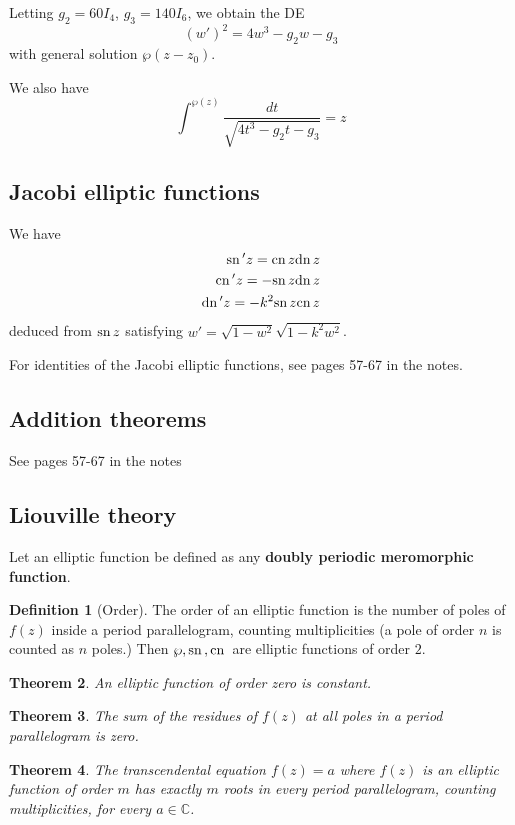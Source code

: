 \documentclass[10pt, oneside, reqno]{amsart}
\theoremstyle{plain}%
\newtheorem{thm}{Theorem}[section]
\theoremstyle{definition}
\newtheorem{defn}[thm]{Definition}
\theoremstyle{remark}
\newcommand{\Com}{\mathbb{C}}
\begin{document}
Letting $g_2 = 60 I_4$, $g_3 = 140 I_6$, we obtain the DE \[
    (w')^2 = 4w^3 - g_2 w - g_3
\] with general solution $\wp(z - z_0)$. 

We also have \[
    \int^{\wp(z)} \frac{dt}{\sqrt{4t^3 - g_2 t - g_3}} = z
\]


\subsection{Jacobi elliptic functions} %
\label{sub:jacobi_elliptic_functions}
 We have \begin{align*}
    \text{sn}\,' z = \text{cn}\, z \text{dn}\, z \\
    \text{cn}\,' z = - \text{sn}\, z \text{dn}\, z \\
    \text{dn}\,' z = - k^2 \text{sn}\, z \text{cn}\, z
 \end{align*} deduced from $\text{sn}\, z$ satisfying $w' = \sqrt{1 - w^2}\sqrt{1 - k^2 w^2}$. 

For identities of the Jacobi elliptic functions, see pages 57-67 in the notes.

\subsection{Addition theorems} %
\label{sub:addition_theorems}
See pages 57-67 in the notes

\subsection{Liouville theory} %
\label{sub:liouville_theory}
Let an elliptic function be defined as any \textbf{doubly periodic meromorphic function}.  
\begin{defn}[Order]
    The order of an elliptic function is the number of poles of $f(z)$ inside a period parallelogram, counting multiplicities (a pole of order $n$ is counted as $n$ poles.)  Then $\wp, \text{sn}\,, \text{cn}\,$ are elliptic functions of order $2$.  
\end{defn}

\begin{thm}
    An elliptic function of order zero is constant.
\end{thm}

\begin{thm}
    The sum of the residues of $f(z)$ at all poles in a period parallelogram is zero.
\end{thm}

\begin{thm}
    The transcendental equation $f(z) = a$ where $f(z)$ is an elliptic function of order $m$ has exactly $m$ roots in every period parallelogram, counting multiplicities, for every $a \in \Com$.  
\end{thm}
\end{document}
